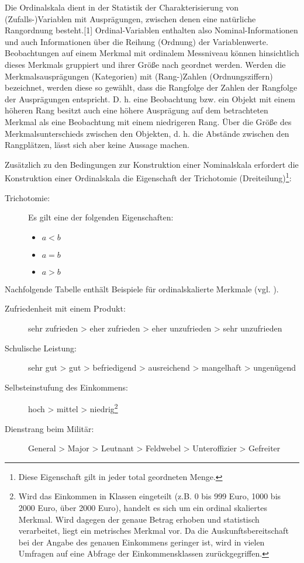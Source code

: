 \todo[Umformulieren]
Die Ordinalskala dient in der Statistik der Charakterisierung von (Zufalls-)Variablen mit Ausprägungen, zwischen denen eine natürliche Rangordnung besteht.[1] Ordinal-Variablen enthalten also Nominal-Informationen und auch Informationen über die Reihung (Ordnung) der Variablenwerte. Beobachtungen auf einem Merkmal mit ordinalem Messniveau können hinsichtlich dieses Merkmals gruppiert und ihrer Größe nach geordnet werden.
Werden die Merkmalsausprägungen (Kategorien) mit (Rang-)Zahlen (Ordnungsziffern) bezeichnet, werden diese so gewählt, dass die Rangfolge der Zahlen der Rangfolge der Ausprägungen entspricht. D. h. eine Beobachtung bzw. ein Objekt mit einem höheren Rang besitzt auch eine höhere Ausprägung auf dem betrachteten Merkmal als eine Beobachtung mit einem niedrigeren Rang. Über die Größe des Merkmalsunterschieds zwischen den Objekten, d. h. die Abstände zwischen den Rangplätzen, lässt sich aber keine Aussage machen.


Zusätzlich zu den Bedingungen zur Konstruktion einer Nominalskala erfordert die Konstruktion einer Ordinalskala die Eigenschaft der Trichotomie (Dreiteilung)\footnote{Diese Eigenschaft gilt in jeder total geordneten Menge.}:
\begin{description}
	\item[Trichotomie:] Es gilt eine der folgenden Eigenschaften:
		\begin{itemize}
		  \item $a < b$
		  \item $a = b$
		  \item $a > b$ 
		\end{itemize} 
\end{description}

Nachfolgende Tabelle enthält Beispiele für ordinalskalierte Merkmale (vgl.
).
\begin{description}
  \item[Zufriedenheit mit einem Produkt:] sehr zufrieden > eher zufrieden > eher unzufrieden > sehr unzufrieden
  \item[Schulische Leistung:] sehr gut > gut > befriedigend > ausreichend > mangelhaft > ungenügend
  \item[Selbsteinstufung des Einkommens:] hoch > mittel > niedrig\footnote{Wird das Einkommen in
  Klassen eingeteilt (z.B. 0 bis 999 Euro, 1000 bis 2000 Euro, über 2000 Euro), 
  handelt es sich um ein ordinal skaliertes Merkmal. Wird dagegen der genaue Betrag erhoben und statistisch verarbeitet, liegt ein metrisches Merkmal vor. 
  Da die Auskunftsbereitschaft bei der Angabe des genauen Einkommens geringer ist, wird in vielen
  Umfragen auf eine Abfrage der Einkommensklassen zurückgegriffen.}
  \item[Dienstrang beim Militär:] General > Major > Leutnant > Feldwebel > Unteroffizier > Gefreiter
\end{description} 




